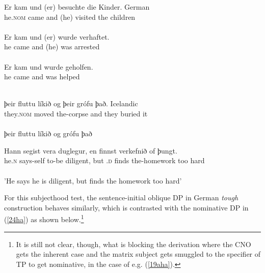 \documentclass[output=paper,colorlinks,citecolor=brown,
]{langscibook}
\begin{document}
\begin{exe}
\ex \label{21ha}
\begin{xlist}
\ex \label{21aha}
\gll Er kam und (er) besuchte die Kinder. \hspace{25mm} German\\ 
he.\textsc{nom} came and (he) visited the children\\\\ 

\ex \label{21bha}
\gll Er kam und (er) wurde verhaftet.\\
he came and (he) was arrested \hspace{2mm} \citep[477]{ZaenenThráinsson1985}\\\\


\ex \label{21cha}
\gll *Er kam und \underline{\hspace{6mm}} wurde geholfen.\\
he came and {} was helped\\\\

\end{xlist}

\ex \label{22ha}
\begin{xlist}
\ex \label{22aha}
\gll ϸeir  fluttu  líkið og   ϸeir grófu   ϸað. 
\hspace{15mm} Icelandic\\
they.\textsc{nom} moved the-corpse and they buried it\\\\

\ex \label{22bha}
ϸeir fluttu líkið og \underline{\hspace{6mm}} grófu ϸað 

\ex \label{22cha}
\gll Hann segist vera duglegur, en \underline{\hspace{6mm}} finnst  verkefnið of ϸungt.\\
he.\textsc{n} says-self to-be diligent, but \underline{\hspace{6mm}}.\textsc{d} finds the-homework too hard\\\\           
'He says he is diligent, but finds the homework too hard' \citep[453-454]{ZaenenThráinsson1985}              
\end{xlist}

\end{exe}
For this subjecthood test, the sentence-initial oblique DP in German \textit{tough} construction behaves similarly, which is contrasted with the nominative DP in (\ref{24ha}) as shown below.\footnote{It is still not clear, though, what is blocking the derivation where the CNO gets the inherent case and the matrix subject gets smuggled to the specifier of TP to get nominative, in the case of e.g. (\ref{19aha}).}
\end{document}
